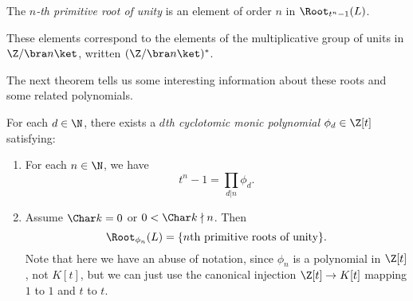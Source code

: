 \documentclass[a4paper]{article}
\begin{document}
\begin{defi}
  The \emph{$n$-th primitive root of unity} is an element of order $n$ in $\Root_{t^n - 1}(L)$.
\end{defi}
These elements correspond to the elements of the multiplicative group of units in $\Z/\bra n\ket$, written $(\Z/\bra n\ket)^*$.

The next theorem tells us some interesting information about these roots and some related polynomials.

\begin{thm}[]
  For each $d \in \N$, there exists a \emph{$d$th cyclotomic monic polynomial} $\phi_d \in \Z[t]$ satisfying:
  \begin{enumerate}
    \item For each $n \in \N$, we have
      \[
        t^n - 1 = \prod_{d | n} \phi_d.
      \]
    \item Assume $\Char k = 0$ or $0 < \Char k \nmid n$. Then
      \[
        \Root_{\phi_n}(L) = \{n\text{th primitive roots of unity}\}.
      \]
      Note that here we have an abuse of notation, since $\phi_n$ is a polynomial in $\Z[t]$, not $K[t]$, but we can just use the canonical injection $\Z[t] \to K[t]$ mapping $1$ to $1$ and $t$ to $t$.
  \end{enumerate}
\end{thm}
\end{document}
